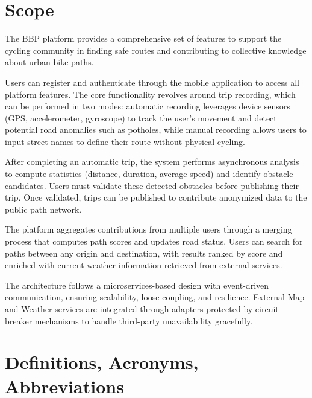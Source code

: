\section{Scope}
The BBP platform provides a comprehensive set of features to support the cycling community in finding safe routes and contributing to collective knowledge about urban bike paths.

Users can register and authenticate through the mobile application to access all platform features. The core functionality revolves around trip recording, which can be performed in two modes: automatic recording leverages device sensors (GPS, accelerometer, gyroscope) to track the user's movement and detect potential road anomalies such as potholes, while manual recording allows users to input street names to define their route without physical cycling.

After completing an automatic trip, the system performs asynchronous analysis to compute statistics (distance, duration, average speed) and identify obstacle candidates. Users must validate these detected obstacles before publishing their trip. Once validated, trips can be published to contribute anonymized data to the public path network.

The platform aggregates contributions from multiple users through a merging process that computes path scores and updates road status. Users can search for paths between any origin and destination, with results ranked by score and enriched with current weather information retrieved from external services.

The architecture follows a microservices-based design with event-driven communication, ensuring scalability, loose coupling, and resilience. External Map and Weather services are integrated through adapters protected by circuit breaker mechanisms to handle third-party unavailability gracefully.

\section{Definitions, Acronyms, Abbreviations}

